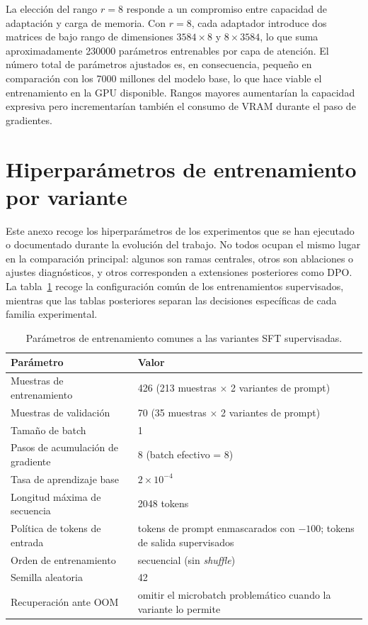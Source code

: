 La elección del rango $r = 8$ responde a un compromiso entre capacidad de adaptación y carga de memoria. Con $r = 8$, cada adaptador introduce dos matrices de bajo rango de
dimensiones $3584 \times 8$ y $8 \times 3584$, lo que suma aproximadamente 230000 parámetros entrenables por capa de atención. El número total de parámetros ajustados es, en
consecuencia, pequeño en comparación con los 7000 millones del modelo base, lo que hace viable el entrenamiento en la GPU disponible. Rangos mayores aumentarían la capacidad
expresiva pero incrementarían también el consumo de VRAM durante el paso de gradientes.

\section{Hiperparámetros de entrenamiento por variante}

Este anexo recoge los hiperparámetros de los experimentos que se han ejecutado o documentado durante la evolución del trabajo. No todos ocupan el mismo lugar en la comparación
principal: algunos son ramas centrales, otros son ablaciones o ajustes diagnósticos, y otros corresponden a extensiones posteriores como DPO. La tabla~\ref{tab:AnexoA_train_common}
recoge la configuración común de los entrenamientos supervisados, mientras que las tablas posteriores separan las decisiones específicas de cada familia experimental.

\begin{table}[htbp]
\centering
\caption{Parámetros de entrenamiento comunes a las variantes SFT supervisadas.}
\label{tab:AnexoA_train_common}
\begin{tabularx}{\textwidth}{p{}X}
\toprule
\textbf{Parámetro} & \textbf{Valor} \\
\midrule
Muestras de entrenamiento & 426 (213 muestras $\times$ 2 variantes de prompt) \\
Muestras de validación & 70 (35 muestras $\times$ 2 variantes de prompt) \\
Tamaño de batch & 1 \\
Pasos de acumulación de gradiente & 8 (batch efectivo = 8) \\
Tasa de aprendizaje base & $2 \times 10^{-4}$ \\
Longitud máxima de secuencia & 2048 tokens \\
Política de tokens de entrada & tokens de prompt enmascarados con $-100$; tokens de salida supervisados \\
Orden de entrenamiento & secuencial (sin \textit{shuffle}) \\
Semilla aleatoria & 42 \\
Recuperación ante OOM & omitir el microbatch problemático cuando la variante lo permite \\
\bottomrule
\end{tabularx}
\end{table}

